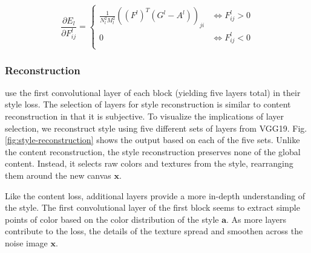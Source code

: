 \documentclass{article}
\begin{document}
\begin{equation}
\label{eq:style-grad}
\frac{\partial E_l}{\partial F^l_{ij}} =
\begin{cases}
    \frac{1}{N^2_l M^2_l}((F^l)^T (G^l - A^l))_{ji} & \iff F^l_{ij} > 0 \\
    0 & \iff F^l_{ij} < 0 \\
\end{cases}
\end{equation}

\subsubsection{Reconstruction}

\cite{2015arXiv150806576G} use the first convolutional layer of each block
(yielding five layers total) in their style loss. The selection of layers
for style reconstruction is similar to content reconstruction in that it is
subjective. To visualize the implications of layer selection, we reconstruct
style using five different sets of layers from VGG19. Fig.
\ref{fig:style-reconstruction} shows the output based on each of the five
sets. Unlike the content reconstruction, the style reconstruction preserves
none of the global content. Instead, it selects raw colors and textures from
the style, rearranging them around the new canvas $\textbf{x}$.

Like the content loss, additional layers provide a more in-depth understanding
of the style. The first convolutional layer of the first block seems to
extract simple points of color based on the color distribution of the style
$\textbf{a}$. As more layers contribute to the loss, the details of the
texture spread and smoothen across the noise image $\textbf{x}$.
\end{document}
